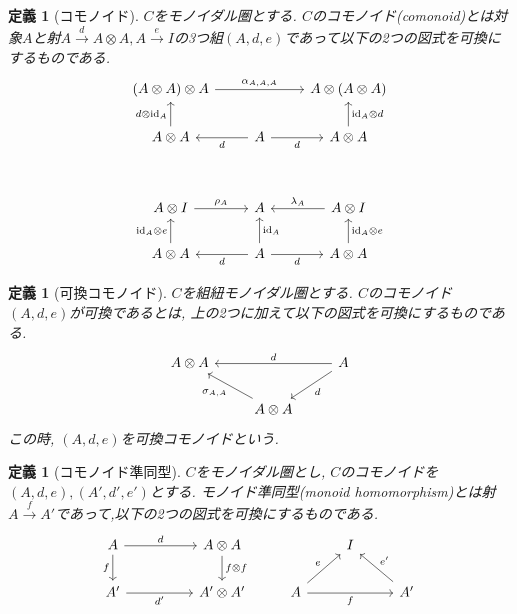 \documentclass[a4paper,12pt]{ltjsarticle}
\theoremstyle{break}
\newtheorem{defn}[thm]{定義}
\newcommand{\xr}[1]{\xrightarrow{#1}}
\newcommand{\id}{\mathrm{id}}
\newcommand{\al}{\alpha}
\newcommand{\la}{\lambda}
\newcommand{\si}{\sigma}
\newcommand{\ot}{\otimes}
\numberwithin{equation}{section}
\begin{document}
\begin{defn}[コモノイド]
  $C$をモノイダル圏とする. 
  $C$のコモノイド(comonoid)とは対象$A$と射$A \xr{d} A \ot A, A \xr{e} I$の3つ組$(A,d,e)$であって以下の2つの図式を可換にするものである. 
  \[\begin{tikzcd}
    {(A \ot A) \ot A} && {A \ot (A \ot A)} \\
    {A \ot A} & A & {A \ot A} \\
    \\
    {A \ot I} & A & {A \ot I} \\
    {A \ot A} & A & {A \ot A}
    \arrow["{\id_A \ot d}"', from=2-3, to=1-3]
    \arrow["{\al_{A,A,A}}", from=1-1, to=1-3]
    \arrow["{d \ot \id_A}", from=2-1, to=1-1]
    \arrow["d"', from=2-2, to=2-3]
    \arrow["d", from=2-2, to=2-1]
    \arrow["{\id_A}"', from=5-2, to=4-2]
    \arrow["{\la_A}"', from=4-3, to=4-2]
    \arrow["{\id_A \ot e}"', from=5-3, to=4-3]
    \arrow["d"', from=5-2, to=5-3]
    \arrow["{\rho_A}", from=4-1, to=4-2]
    \arrow["{\id_A \ot e}", from=5-1, to=4-1]
    \arrow["d", from=5-2, to=5-1]
  \end{tikzcd}\]
\end{defn}

\begin{defn}[可換コモノイド]
  $C$を組紐モノイダル圏とする. 
  $C$のコモノイド$(A,d,e)$が可換であるとは, 上の2つに加えて以下の図式を可換にするものである.
  \[\begin{tikzcd}
    {A \ot A} && A \\
    & {A \ot A}
    \arrow["d"', from=1-3, to=1-1]
    \arrow["{\si_{A,A}}", from=2-2, to=1-1]
    \arrow["d", from=1-3, to=2-2]
  \end{tikzcd}\]
  この時, $(A,d,e)$を可換コモノイドという. 
\end{defn}

\begin{defn}[コモノイド準同型]
  $C$をモノイダル圏とし, $C$のコモノイドを$(A,d,e), (A',d',e')$とする. 
  モノイド準同型(monoid homomorphism)とは射$A \xr{f} A'$であって,以下の2つの図式を可換にするものである. 
  \[\begin{tikzcd}
    A && {A \ot A} && I \\
    {A'} && {A' \ot A'} & A && {A'}
    \arrow["d", from=1-1, to=1-3]
    \arrow["{f \ot f}", from=1-3, to=2-3]
    \arrow["f"', from=1-1, to=2-1]
    \arrow["{d'}"', from=2-1, to=2-3]
    \arrow["e", from=2-4, to=1-5]
    \arrow["f"', from=2-4, to=2-6]
    \arrow["{e'}"', from=2-6, to=1-5]
  \end{tikzcd}\]
\end{defn}
\end{document}
